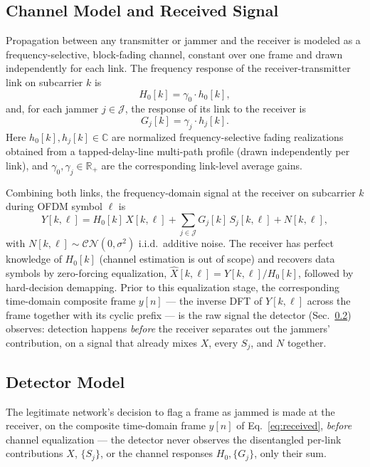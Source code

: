 \documentclass[journal]{IEEEtran}
\newcommand{\rar}[1]{{\color{blue}{[#1]}}}
\begin{document}
\subsection{Channel Model and Received Signal}
Propagation between any transmitter or jammer and the receiver is modeled as a frequency-selective, block-fading channel, constant over one frame and drawn independently for each link.
The frequency response of the receiver-transmitter link on subcarrier $k$ is
\begin{equation}
H_0[k] = \gamma_0 \cdot h_0[k],
\label{eq:channel-tx}
\end{equation}
and, for each jammer $j \in \mathcal{J}$, the response of its link to the
receiver is
\begin{equation}
G_j[k] = \gamma_j \cdot h_j[k].
\label{eq:channel-jam}
\end{equation}
Here $h_0[k], h_j[k] \in \mathbb{C}$ are normalized frequency-selective fading
realizations obtained from a tapped-delay-line multi-path profile (drawn
independently per link), and $\gamma_0, \gamma_j \in \mathbb{R}_{+}$ are the
corresponding link-level average gains.
\rar{$\gamma_0,\gamma_j$ are currently free per-link parameters (a stand-in
for geometry); deriving them from transmitter/jammer/receiver positions via a
path-loss law is a natural extension once (and if) node positions are
introduced.}
\rar{TDL profile, delay spread, and carrier frequency deferred to Experiment
Setup.}

Combining both links, the frequency-domain signal at the receiver on
subcarrier $k$ during OFDM symbol $\ell$ is
\begin{equation}
Y[k,\ell] = H_0[k]\,X[k,\ell] + \sum_{j\in\mathcal{J}} G_j[k]\,S_j[k,\ell] + N[k,\ell],
\label{eq:received}
\end{equation}
with $N[k,\ell]\sim\mathcal{CN}(0,\sigma^2)$ i.i.d.\ additive noise.
The receiver has perfect knowledge of $H_0[k]$ (channel estimation is out of
scope) and recovers data symbols by zero-forcing equalization,
$\hat X[k,\ell] = Y[k,\ell]/H_0[k]$, followed by hard-decision demapping.
Prior to this equalization stage, the corresponding time-domain composite
frame $y[n]$ — the inverse DFT of $Y[k,\ell]$ across the frame together with
its cyclic prefix — is the raw signal the detector (Sec.~\ref{sec:detector})
observes: detection happens \emph{before} the receiver separates out the
jammers' contribution, on a signal that already mixes $X$, every $S_j$, and
$N$ together.

\subsection{Detector Model} \label{sec:detector}
The legitimate network's decision to flag a frame as jammed is made at the
receiver, on the composite time-domain frame $y[n]$ of
Eq.~\eqref{eq:received}, \emph{before} channel equalization — the detector
never observes the disentangled per-link contributions $X$, $\{S_j\}$, or the
channel responses $H_0,\{G_j\}$, only their sum.
\end{document}
